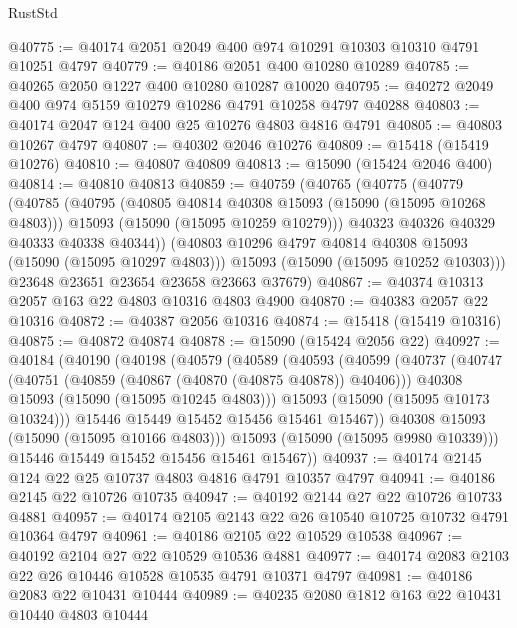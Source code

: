 \begin{lexlean}{RustStd}
\begin{coremodule}
@40775 := @40174 @2051 @2049 @400 @974 @10291 @10303 @10310 @4791 @10251 @4797
@40779 := @40186 @2051 @400 @10280 @10289
@40785 := @40265 @2050 @1227 @400 @10280 @10287 @10020
@40795 := @40272 @2049 @400 @974 @5159 @10279 @10286 @4791 @10258 @4797 @40288
@40803 := @40174 @2047 @124 @400 @25 @10276 @4803 @4816 @4791
@40805 := @40803 @10267 @4797
@40807 := @40302 @2046 @10276
@40809 := @15418 (@15419 @10276)
@40810 := @40807 @40809
@40813 := @15090 (@15424 @2046 @400)
@40814 := @40810 @40813
@40859 := @40759
    (@40765
      (@40775
        (@40779
          (@40785
            (@40795
              (@40805 @40814 @40308 @15093 (@15090 (@15095 @10268 @4803)))
              @15093
              (@15090 (@15095 @10259 @10279)))
            @40323
            @40326
            @40329
            @40333
            @40338
            @40344))
        (@40803 @10296 @4797 @40814 @40308 @15093 (@15090 (@15095 @10297 @4803)))
        @15093
        (@15090 (@15095 @10252 @10303)))
      @23648
      @23651
      @23654
      @23658
      @23663
      @37679)
@40867 := @40374 @10313 @2057 @163 @22 @4803 @10316 @4803 @4900
@40870 := @40383 @2057 @22 @10316
@40872 := @40387 @2056 @10316
@40874 := @15418 (@15419 @10316)
@40875 := @40872 @40874
@40878 := @15090 (@15424 @2056 @22)
@40927 := @40184
    (@40190
      (@40198
        (@40579
          (@40589
            (@40593
              (@40599
                (@40737
                  (@40747
                    (@40751 (@40859 (@40867 (@40870 (@40875 @40878)) @40406)))
                    @40308
                    @15093
                    (@15090 (@15095 @10245 @4803)))
                  @15093
                  (@15090 (@15095 @10173 @10324)))
                @15446
                @15449
                @15452
                @15456
                @15461
                @15467))
            @40308
            @15093
            (@15090 (@15095 @10166 @4803)))
          @15093
          (@15090 (@15095 @9980 @10339)))
        @15446
        @15449
        @15452
        @15456
        @15461
        @15467))
@40937 := @40174 @2145 @124 @22 @25 @10737 @4803 @4816 @4791 @10357 @4797
@40941 := @40186 @2145 @22 @10726 @10735
@40947 := @40192 @2144 @27 @22 @10726 @10733 @4881
@40957 := @40174 @2105 @2143 @22 @26 @10540 @10725 @10732 @4791 @10364 @4797
@40961 := @40186 @2105 @22 @10529 @10538
@40967 := @40192 @2104 @27 @22 @10529 @10536 @4881
@40977 := @40174 @2083 @2103 @22 @26 @10446 @10528 @10535 @4791 @10371 @4797
@40981 := @40186 @2083 @22 @10431 @10444
@40989 := @40235 @2080 @1812 @163 @22 @10431 @10440 @4803 @10444

\end{coremodule}
\end{lexlean}
